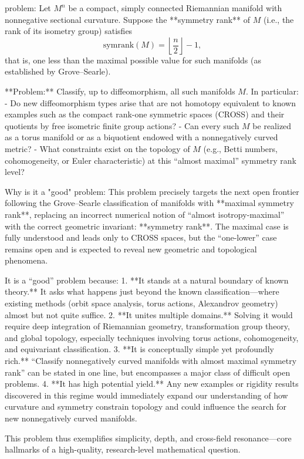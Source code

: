 problem:  
Let \( M^n \) be a compact, simply connected Riemannian manifold with nonnegative sectional curvature. Suppose the **symmetry rank** of \( M \) (i.e., the rank of its isometry group) satisfies  
\[
\mathrm{symrank}(M) = \left\lfloor \frac{n}{2} \right\rfloor - 1,
\]
that is, one less than the maximal possible value for such manifolds (as established by Grove–Searle).  

**Problem:**  
Classify, up to diffeomorphism, all such manifolds \( M \). In particular:  
- Do new diffeomorphism types arise that are not homotopy equivalent to known examples such as the compact rank-one symmetric spaces (CROSS) and their quotients by free isometric finite group actions?  
- Can every such \( M \) be realized as a torus manifold or as a biquotient endowed with a nonnegatively curved metric?  
- What constraints exist on the topology of \( M \) (e.g., Betti numbers, cohomogeneity, or Euler characteristic) at this “almost maximal” symmetry rank level?  

Why is it a "good" problem:  
This problem precisely targets the next open frontier following the Grove–Searle classification of manifolds with **maximal symmetry rank**, replacing an incorrect numerical notion of “almost isotropy-maximal” with the correct geometric invariant: **symmetry rank**. The maximal case is fully understood and leads only to CROSS spaces, but the “one-lower” case remains open and is expected to reveal new geometric and topological phenomena.  

It is a “good” problem because:  
1. **It stands at a natural boundary of known theory.** It asks what happens just beyond the known classification—where existing methods (orbit space analysis, torus actions, Alexandrov geometry) almost but not quite suffice.  
2. **It unites multiple domains.** Solving it would require deep integration of Riemannian geometry, transformation group theory, and global topology, especially techniques involving torus actions, cohomogeneity, and equivariant classification.  
3. **It is conceptually simple yet profoundly rich.** “Classify nonnegatively curved manifolds with almost maximal symmetry rank” can be stated in one line, but encompasses a major class of difficult open problems.  
4. **It has high potential yield.** Any new examples or rigidity results discovered in this regime would immediately expand our understanding of how curvature and symmetry constrain topology and could influence the search for new nonnegatively curved manifolds.  

This problem thus exemplifies simplicity, depth, and cross-field resonance—core hallmarks of a high-quality, research-level mathematical question.
